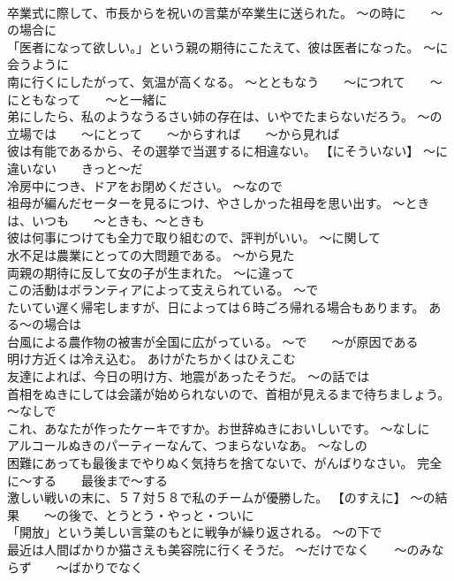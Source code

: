 \documentclass[8pt]{extreport}
\begin{document}
\begin{CJK}{UTF8}{min}
\\	卒業式に際して、市長からを祝いの言葉が卒業生に送られた。	～の時に　　～の場合に
\\	「医者になって欲しい。」という親の期待にこたえて、彼は医者になった。	～に会うように
\\	南に行くにしたがって、気温が高くなる。	～とともなう　　～につれて　　～にともなって　　～と一緒に
\\	弟にしたら、私のようなうるさい姉の存在は、いやでたまらないだろう。	～の立場では　　～にとって　　～からすれば　　～から見れば
\\	彼は有能であるから、その選挙で当選するに相違ない。	【にそういない】 ～に違いない　　きっと～だ
\\	冷房中につき、ドアをお閉めください。	～なので
\\	祖母が編んだセーターを見るにつけ、やさしかった祖母を思い出す。	～ときは、いつも　　～ときも、～ときも
\\	彼は何事につけても全力で取り組むので、評判がいい。	～に関して
\\	水不足は農業にとっての大問題である。	～から見た
\\	両親の期待に反して女の子が生まれた。	～に違って
\\	この活動はボランティアによって支えられている。	～で
\\	たいてい遅く帰宅しますが、日によっては６時ごろ帰れる場合もあります。	ある～の場合は
\\	台風による農作物の被害が全国に広がっている。	～で　　～が原因である
\\	明け方近くは冷え込む。	あけがたちかくはひえこむ 
\\	友達によれば、今日の明け方、地震があったそうだ。	～の話では
\\	首相をぬきにしては会議が始められないので、首相が見えるまで待ちましょう。	～なしで
\\	これ、あなたが作ったケーキですか。お世辞ぬきにおいしいです。	～なしに
\\	アルコールぬきのパーティーなんて、つまらないなあ。	～なしの
\\	困難にあっても最後までやりぬく気持ちを捨てないで、がんばりなさい。	完全に～する　　最後まで～する
\\	激しい戦いの末に、５７対５８で私のチームが優勝した。	【のすえに】 ～の結果　　～の後で、とうとう・やっと・ついに
\\	「開放」という美しい言葉のもとに戦争が繰り返される。	～の下で
\\	最近は人間ばかりか猫さえも美容院に行くそうだ。	～だけでなく　　～のみならず　　～ばかりでなく

\end{CJK}
\end{document}
